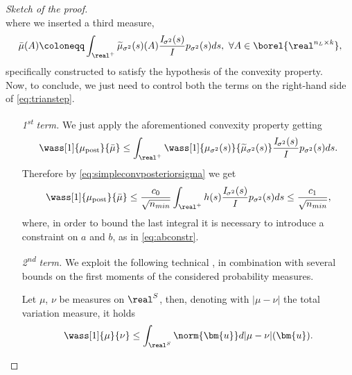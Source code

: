 \begin{proof}[Sketch of the proof]
\begin{equation}
    \end{equation}
    where we inserted a third measure,
    \begin{equation} \label{eq:barmu}
        \bar{\mu}(A) \coloneqq \int_{\real^+} \widetilde{\mu}_{\sigma^2}(s)(A) \frac{\mathit{I}_{\sigma^2}(s)}{\mathit{I}} p_{\sigma^2}(s) ds, \ \forall A \in \borel{\real^{n_L \times k}},
    \end{equation}
    specifically constructed to satisfy the hypothesis of the convexity property. \\
    Now, to conclude, we just need to control both the terms on the right-hand side of \cref{eq:trianstep}.
    \begin{itemize}[leftmargin = 2.5cm]
        \item[\textit{1\textsuperscript{st} term.}] We just apply the aforementioned convexity property getting
        \begin{equation*}
            \wass[1]{\mu_{\mathrm{post}}}{\bar{\mu}} \leq \int_{\real^+} \wass[1]{\mu_{\sigma^2}(s)}{\widetilde{\mu}_{\sigma^2}(s)} \frac{\mathit{I}_{\sigma^2}(s)}{\mathit{I}} p_{\sigma^2}(s) ds.
        \end{equation*}
        Therefore by \cref{eq:simpleconvposteriorsigma} we get 
        \begin{equation*}
            \wass[1]{\mu_{\mathrm{post}}}{\bar{\mu}} \leq \frac{c_0}{\sqrt{n_{min}}} \int_{\real^+} h(s) \frac{\mathit{I}_{\sigma^2}(s)}{\mathit{I}} p_{\sigma^2}(s) ds \leq \frac{c_1}{\sqrt{n_{min}}},
        \end{equation*}
        where, in order to bound the last integral it is necessary to introduce a constraint on $a$ and $b$, as in \cref{eq:abconstr}.
        \item[\textit{2\textsuperscript{nd} term.}] We exploit the following technical , in combination with several bounds on the first moments of the considered probability measures.
        \begin{lemma} \label{lem:boundwasstv}
            Let $\mu$, $\nu$ be measures on $\real^S$, then, denoting with $|\mu - \nu|$ the total variation measure, it holds
            \begin{equation*}
                \wass[1]{\mu}{\nu} \leq \int_{\real^S} \norm{\bm{u}} d |\mu - \nu|(\bm{u}).
            \end{equation*}
        \end{lemma}
    \end{itemize}
    \vskip-10pt
\end{proof}

